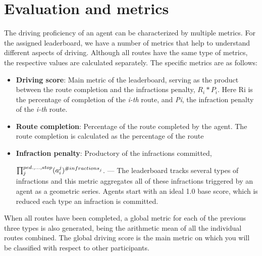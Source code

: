 \documentclass{article}
\begin{document}
\section{Evaluation and metrics}
The driving proficiency of an agent can be characterized by multiple metrics. For the assigned leaderboard, we have a number of metrics that help 
to understand different aspects of driving. Although all routes have the same type of metrics, the respective values are calculated separately. 
The specific metrics are as follows:
\begin{itemize}
  \item \textbf{Driving score}: Main metric of the leaderboard, serving as the product between the route completion and the infractions penalty, $R_i * P_i$.
  Here Ri is the percentage of completion of the \textit{i-th} route, and \textit{Pi}, 
  the infraction penalty of the \textit{i-th} route.
  \item \textbf{Route completion}: Percentage of the route completed by the agent. The route completion is calculated as the percentage of the route
  \item \textbf{Infraction penalty}: Productory of the infractions committed, 

  
  $\prod_{j}^{ped., ..., stop} (a_{\small{i}}^{\small{j}})^{\small{\#infractions}_j}$. — 
  The leaderboard tracks several types of infractions and this metric aggregates all of these infractions triggered by an agent as a geometric series. Agents start with an ideal 1.0 
  base score, which is reduced each type an infraction is committed.
\end{itemize}
When all routes have been completed, a global metric for each of the previous three types is also generated, being the arithmetic mean of all the individual routes combined. 
The global driving score is the main metric on which you will be classified with respect to other participants.
\end{document}
